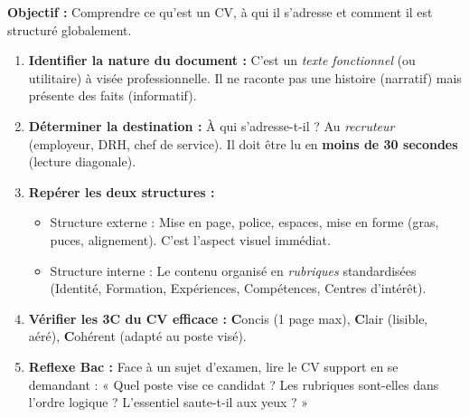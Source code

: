 \documentclass[11pt]{article}
\newcommand{\cle}[1]{{\popxbold\color{popdark}#1}}
\begin{document}
\begin{methode}
    \textbf{Objectif :} Comprendre ce qu'est un CV, à qui il s'adresse et comment il est structuré globalement.
    \begin{enumerate}
        \item \textbf{Identifier la nature du document :} C'est un \emph{texte fonctionnel} (ou utilitaire) à visée professionnelle. Il ne raconte pas une histoire (narratif) mais présente des faits (informatif).
        \item \textbf{Déterminer la destination :} À qui s'adresse-t-il ? Au \emph{recruteur} (employeur, DRH, chef de service). Il doit être lu en \textbf{moins de 30 secondes} (lecture diagonale).
        \item \textbf{Repérer les deux structures :}
              \begin{itemize}
                  \item \cle{Structure externe} : Mise en page, police, espaces, mise en forme (gras, puces, alignement). C'est l'aspect visuel immédiat.
                  \item \cle{Structure interne} : Le contenu organisé en \emph{rubriques} standardisées (Identité, Formation, Expériences, Compétences, Centres d'intérêt).
              \end{itemize}
        \item \textbf{Vérifier les 3C du CV efficace :} \textbf{C}oncis (1 page max), \textbf{C}lair (lisible, aéré), \textbf{C}ohérent (adapté au poste visé).
        \item \textbf{Reflexe Bac :} Face à un sujet d'examen, lire le CV support en se demandant : « Quel poste vise ce candidat ? Les rubriques sont-elles dans l'ordre logique ? L'essentiel saute-t-il aux yeux ? »
    \end{enumerate}
\end{methode}
\end{document}
